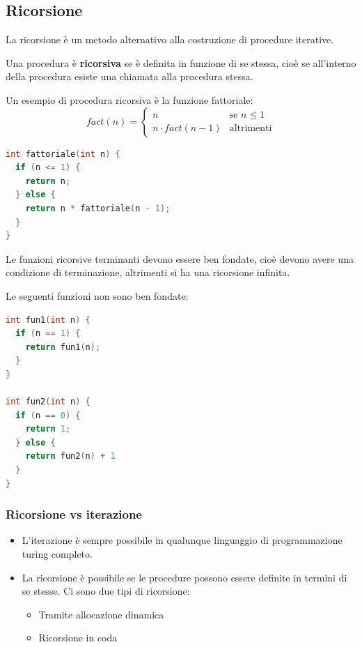 \documentclass[a4paper]{article}
\begin{document}
\subsection{Ricorsione}
La ricorsione è un metodo alternativo alla costruzione di procedure iterative.
\begin{definition}
  Una procedura è \textbf{ricorsiva} se è definita in funzione di se stessa,
  cioè se all'interno della procedura esiste una chiamata alla procedura stessa.
\end{definition}

\begin{example}
  Un esempio di procedura ricorsiva è la funzione fattoriale:
  \[
    fact(n) = \begin{cases}
      n & \text{se } n \le 1 \\
      n \cdot fact(n-1) & \text{altrimenti} 
    \end{cases}
  \] 
\begin{lstlisting}[language=c]
int fattoriale(int n) {
  if (n <= 1) {
    return n;
  } else {
    return n * fattoriale(n - 1);
  }
}
\end{lstlisting}
\end{example}

\vspace{1em}
\noindent
Le funzioni ricorsive terminanti devono essere ben fondate, cioè devono avere una condizione di
terminazione, altrimenti si ha una ricorsione infinita. 
\begin{example}
  Le seguenti funzioni non sono ben fondate:
\begin{lstlisting}[language=c]
int fun1(int n) {
  if (n == 1) {
    return fun1(n);
  }
}

int fun2(int n) {
  if (n == 0) {
    return 1;
  } else {
    return fun2(n) + 1
  }
}
\end{lstlisting}
\end{example}

\subsubsection{Ricorsione vs iterazione}
\begin{itemize}
  \item L'iterazione è sempre possibile in qualunque linguaggio di programmazione
    turing completo.

  \item La ricorsione è possibile se le procedure possono essere definite in termini
    di se stesse. Ci sono due tipi di ricorsione:
    \begin{itemize}
      \item Tramite allocazione dinamica
      \item Ricorsione in coda
    \end{itemize}
\end{itemize}
\end{document}
